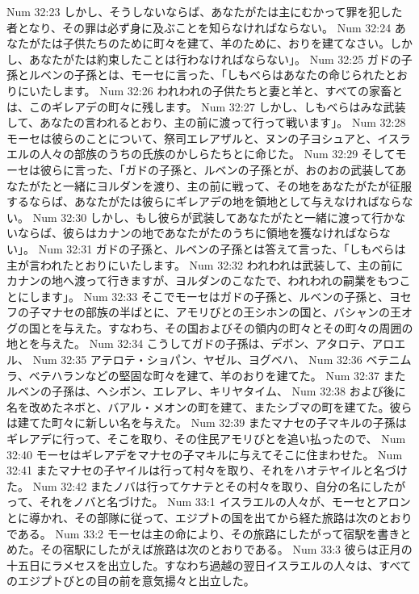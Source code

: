 Num 32:23  しかし、そうしないならば、あなたがたは主にむかって罪を犯した者となり、その罪は必ず身に及ぶことを知らなければならない。
Num 32:24  あなたがたは子供たちのために町々を建て、羊のために、おりを建てなさい。しかし、あなたがたは約束したことは行わなければならない」。
Num 32:25  ガドの子孫とルベンの子孫とは、モーセに言った、「しもべらはあなたの命じられたとおりにいたします。
Num 32:26  われわれの子供たちと妻と羊と、すべての家畜とは、このギレアデの町々に残します。
Num 32:27  しかし、しもべらはみな武装して、あなたの言われるとおり、主の前に渡って行って戦います」。
Num 32:28  モーセは彼らのことについて、祭司エレアザルと、ヌンの子ヨシュアと、イスラエルの人々の部族のうちの氏族のかしらたちとに命じた。
Num 32:29  そしてモーセは彼らに言った、「ガドの子孫と、ルベンの子孫とが、おのおの武装してあなたがたと一緒にヨルダンを渡り、主の前に戦って、その地をあなたがたが征服するならば、あなたがたは彼らにギレアデの地を領地として与えなければならない。
Num 32:30  しかし、もし彼らが武装してあなたがたと一緒に渡って行かないならば、彼らはカナンの地であなたがたのうちに領地を獲なければならない」。
Num 32:31  ガドの子孫と、ルベンの子孫とは答えて言った、「しもべらは主が言われたとおりにいたします。
Num 32:32  われわれは武装して、主の前にカナンの地へ渡って行きますが、ヨルダンのこなたで、われわれの嗣業をもつことにします」。
Num 32:33  そこでモーセはガドの子孫と、ルベンの子孫と、ヨセフの子マナセの部族の半ばとに、アモリびとの王シホンの国と、バシャンの王オグの国とを与えた。すなわち、その国およびその領内の町々とその町々の周囲の地とを与えた。
Num 32:34  こうしてガドの子孫は、デボン、アタロテ、アロエル、
Num 32:35  アテロテ・ショパン、ヤゼル、ヨグベハ、
Num 32:36  ベテニムラ、ベテハランなどの堅固な町々を建て、羊のおりを建てた。
Num 32:37  またルベンの子孫は、ヘシボン、エレアレ、キリヤタイム、
Num 32:38  および後に名を改めたネボと、バアル・メオンの町を建て、またシブマの町を建てた。彼らは建てた町々に新しい名を与えた。
Num 32:39  またマナセの子マキルの子孫はギレアデに行って、そこを取り、その住民アモリびとを追い払ったので、
Num 32:40  モーセはギレアデをマナセの子マキルに与えてそこに住まわせた。
Num 32:41  またマナセの子ヤイルは行って村々を取り、それをハオテヤイルと名づけた。
Num 32:42  またノバは行ってケナテとその村々を取り、自分の名にしたがって、それをノバと名づけた。
Num 33:1  イスラエルの人々が、モーセとアロンとに導かれ、その部隊に従って、エジプトの国を出てから経た旅路は次のとおりである。
Num 33:2  モーセは主の命により、その旅路にしたがって宿駅を書きとめた。その宿駅にしたがえば旅路は次のとおりである。
Num 33:3  彼らは正月の十五日にラメセスを出立した。すなわち過越の翌日イスラエルの人々は、すべてのエジプトびとの目の前を意気揚々と出立した。
